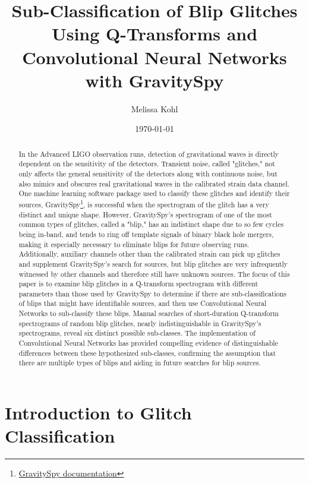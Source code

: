 \documentclass[a4paper]{article}
\title{Sub-Classification of Blip Glitches Using Q-Transforms and Convolutional Neural Networks with GravitySpy}
\author{Melissa Kohl}
\date{\today}
\begin{document}
\maketitle
\graphicspath{ {images/} }

\begin{abstract}

In the Advanced LIGO observation runs, detection of gravitational waves is directly dependent on the sensitivity of the detectors. Transient noise, called "glitches," not only affects the general sensitivity of the detectors along with continuous noise, but also mimics and obscures real gravitational waves in the calibrated strain data channel. One machine learning software package used to classify these glitches and identify their sources, GravitySpy\footnote{\href{https://gravity-spy.github.io}{GravitySpy documentation}}, is successful when the spectrogram of the glitch has a very distinct and unique shape. However, GravitySpy's spectrogram of one of the most common types of glitches, called a "blip," has an indistinct shape due to so few cycles being in-band, and tends to ring off template signals of binary black hole mergers, making it especially necessary to eliminate blips for future observing runs. Additionally, auxiliary channels other than the calibrated strain can pick up glitches and supplement GravitySpy's search for sources, but blip glitches are very infrequently witnessed by other channels and therefore still have unknown sources. The focus of this paper is to examine blip glitches in a Q-transform spectrogram with different parameters than those used by GravitySpy to determine if there are sub-classifications of blips that might have identifiable sources, and then use Convolutional Neural Networks to sub-classify these blips. Manual searches of short-duration Q-transform spectrograms of random blip glitches, nearly indistinguishable in GravitySpy's spectrograms, reveal six distinct possible sub-classes. The implementation of Convolutional Neural Networks has provided compelling evidence of distinguishable differences between these hypothesized sub-classes, confirming the assumption that there are multiple types of blips and aiding in future searches for blip sources.

\end{abstract} 

\section{Introduction to Glitch Classification} \label{introduction}
\end{document}
